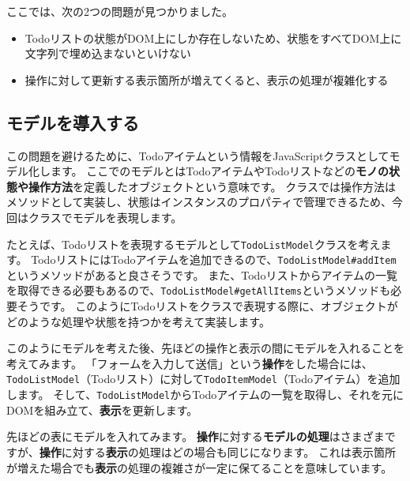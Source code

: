 ここでは、次の2つの問題が見つかりました。

\begin{itemize}
\item
  Todoリストの状態がDOM上にしか存在しないため、状態をすべてDOM上に文字列で埋め込まないといけない
\item
  操作に対して更新する表示箇所が増えてくると、表示の処理が複雑化する
\end{itemize}

\hypertarget{introduce-model}{%
\subsection{モデルを導入する}\label{introduce-model}}

この問題を避けるために、Todoアイテムという情報をJavaScriptクラスとしてモデル化します。
ここでのモデルとはTodoアイテムやTodoリストなどの\textbf{モノの状態や操作方法}を定義したオブジェクトという意味です。
クラスでは操作方法はメソッドとして実装し、状態はインスタンスのプロパティで管理できるため、今回はクラスでモデルを表現します。

たとえば、Todoリストを表現するモデルとして\texttt{TodoListModel}クラスを考えます。
TodoリストにはTodoアイテムを追加できるので、\texttt{TodoListModel\#addItem}というメソッドがあると良さそうです。
また、Todoリストからアイテムの一覧を取得できる必要もあるので、\texttt{TodoListModel\#getAllItems}というメソッドも必要そうです。
このようにTodoリストをクラスで表現する際に、オブジェクトがどのような処理や状態を持つかを考えて実装します。

このようにモデルを考えた後、先ほどの操作と表示の間にモデルを入れることを考えてみます。
「フォームを入力して送信」という\textbf{操作}をした場合には、\texttt{TodoListModel}（Todoリスト）に対して\texttt{TodoItemModel}（Todoアイテム）を追加します。
そして、\texttt{TodoListModel}からTodoアイテムの一覧を取得し、それを元にDOMを組み立て、\textbf{表示}を更新します。

先ほどの表にモデルを入れてみます。
\textbf{操作}に対する\textbf{モデルの処理}はさまざまですが、\textbf{操作}に対する\textbf{表示}の処理はどの場合も同じになります。
これは表示箇所が増えた場合でも\textbf{表示}の処理の複雑さが一定に保てることを意味しています。

